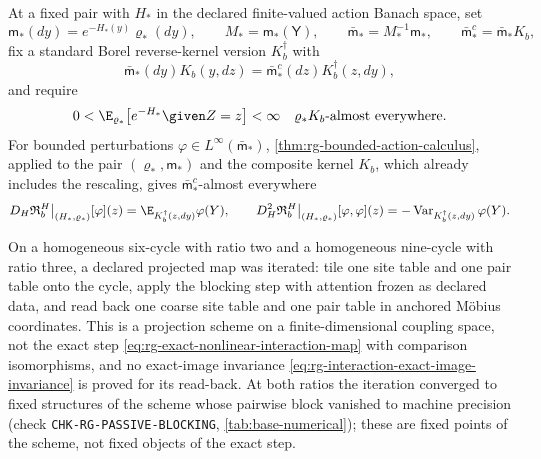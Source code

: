At a fixed pair with \(H_*\) in the declared finite-valued action Banach space,
set
\begin{equation}
\mathsf m_*(dy)=e^{-H_*(y)}\varrho_*(dy),\qquad
M_*=\mathsf m_*(\mathsf Y),\qquad
\bar{\mathsf m}_*=M_*^{-1}\mathsf m_*,\qquad
\bar{\mathsf m}^c_*=\bar{\mathsf m}_*K_b,
\label{eq:rg-fixed-normalized-reverse-data}
\end{equation}
fix a standard Borel reverse-kernel version \(K_b^\dagger\) with
\begin{equation}
\bar{\mathsf m}_*(dy)K_b(y,dz)=\bar{\mathsf m}^c_*(dz)K_b^\dagger(z,dy),
\label{eq:rg-fixed-normalized-reverse-kernel}
\end{equation}
and require
\begin{equation}
0<\E_{\varrho_*}\bigl[e^{-H_*}\given Z=z\bigr]<\infty
\quad\varrho_*K_b\text{-almost everywhere}.
\label{eq:rg-linearization-positive-likelihood}
\end{equation}
For bounded perturbations \(\varphi\in L^\infty(\bar{\mathsf m}_*)\),
\cref{thm:rg-bounded-action-calculus}, applied to the pair \((\varrho_*,\mathsf m_*)\) and
the composite kernel \(K_b\), which already includes the rescaling, gives
\(\bar{\mathsf m}^c_*\)-almost everywhere
\begin{equation}
D_H\mathfrak R^H_b\big|_{(H_*,\varrho_*)}[\varphi](z)
=\E_{K_b^\dagger(z,dy)}\varphi(Y),
\qquad
D_H^2\mathfrak R^H_b\big|_{(H_*,\varrho_*)}[\varphi,\varphi](z)
=-\operatorname{Var}_{K_b^\dagger(z,dy)}\varphi(Y).
\label{eq:rg-linearized-action}
\end{equation}

On a homogeneous six-cycle with ratio two and a homogeneous nine-cycle with
ratio three, a declared projected map was iterated: tile one site table and one
pair table onto the cycle, apply the blocking step with attention frozen as
declared data, and read back one coarse site table and one pair table in
anchored M\"obius coordinates. This is a projection scheme on a
finite-dimensional coupling space, not the exact step
\eqref{eq:rg-exact-nonlinear-interaction-map} with comparison isomorphisms, and
no exact-image invariance \eqref{eq:rg-interaction-exact-image-invariance} is
proved for its read-back. At both ratios the iteration converged to fixed
structures of the scheme whose pairwise block vanished to machine precision
(check \texttt{CHK-RG-PASSIVE-BLOCKING}, \cref{tab:base-numerical}); these are
fixed points of the scheme, not fixed objects of the exact step.

